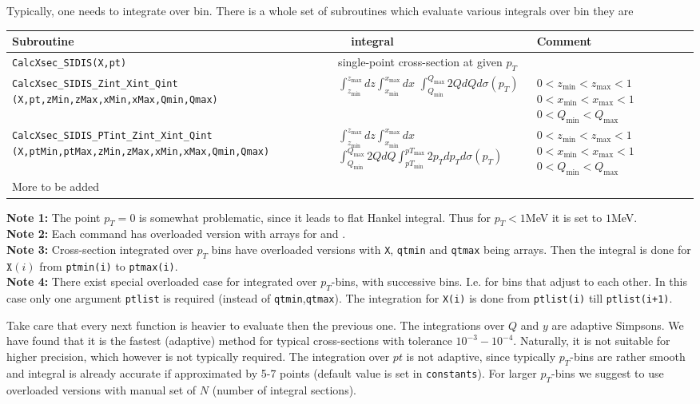 \documentclass[prd,nofootinbib,eqsecnum,final]{revtex4}
\renewcommand{\(}{\left(}
\renewcommand{\)}{\right)}
\renewcommand{\[}{\left[}
\renewcommand{\]}{\right]}
\newcommand{\red}[1]{{\color[rgb]{1,0,0} #1}}
\begin{document}
Typically, one needs to integrate over bin. There is a whole set of subroutines which evaluate various integrals over bin they are
\begin{center}
\small
\begin{tabular}{||p{8cm}|p{5cm}||p{3cm}||}
\hline\hline
Subroutine & ~~integral~~&  Comment
\\\hline
\texttt{CalcXsec\_SIDIS(X,pt)} & single-point cross-section at given $p_T$ & 
\\\hline
\texttt{CalcXsec\_SIDIS\_Zint\_Xint\_Qint} \texttt{(X,pt,zMin,zMax,xMin,xMax,Qmin,Qmax)} & $\int_{z_{\min}}^{z_{\max}}dz \int_{x_{\min}}^{x_{\max}}dx $ $\int_{Q_{\min}}^{Q_{\max}} 2Q dQ d\sigma(p_T)$ & $0<z_{\min}<z_{\max}<1$ $0<x_{\min}<x_{\max}<1$ ~$0<Q_{\min}<Q_{\max}$ 
\\\hline
\texttt{CalcXsec\_SIDIS\_PTint\_Zint\_Xint\_Qint} \texttt{(X,ptMin,ptMax,zMin,zMax,xMin,xMax,Qmin,Qmax)} & $\int_{z_{\min}}^{z_{\max}}dz \int_{x_{\min}}^{x_{\max}}dx $ $\int_{Q_{\min}}^{Q_{\max}} 2Q dQ \int_{pT_{\min}}^{pT_{\max}} 2p_T dp_T d\sigma(p_T)$ & $0<z_{\min}<z_{\max}<1$ $0<x_{\min}<x_{\max}<1$ $0<Q_{\min}<Q_{\max}$ 
\\\hline
\red{More to be added} &&
\\\hline\hline
\end{tabular}
\end{center}
\begin{tcolorbox}
\textbf{Note 1:} The point $p_T=0$ is somewhat problematic, since it leads to flat Hankel integral. Thus for $p_T<1$MeV it is set to $1$MeV.
\\
\textbf{Note 2:} Each command has overloaded version with arrays for  and .
\\
\textbf{Note 3:} Cross-section integrated over $p_T$ bins have overloaded versions with \texttt{X}, \texttt{qtmin} and \texttt{qtmax} being arrays. Then the integral is done for $\texttt{X}(i)$ from \texttt{ptmin(i)} to \texttt{ptmax(i)}.
\\
\textbf{Note 4:} There exist special overloaded case for integrated over $p_T$-bins, with successive bins. I.e. for bins that adjust to each other. In this case only one argument \texttt{ptlist} is required (instead of \texttt{qtmin},\texttt{qtmax}). The integration for \texttt{X(i)} is done from \texttt{ptlist(i)} till \texttt{ptlist(i+1)}.
\end{tcolorbox}


Take care that every next function is heavier to evaluate then the previous one. The integrations over $Q$ and $y$ are adaptive Simpsons. We have found that it is the fastest (adaptive) method for typical cross-sections with tolerance $10^{-3}-10^{-4}$. Naturally, it is not suitable for higher precision, which however is not typically required. The integration over $pt$ is not adaptive, since typically $p_T$-bins are rather smooth and integral is already accurate if approximated by 5-7 points (default value is set in \texttt{constants}). For larger $p_T$-bins we suggest to use overloaded versions with manual set of $N$ (number of integral sections).
\end{document}
